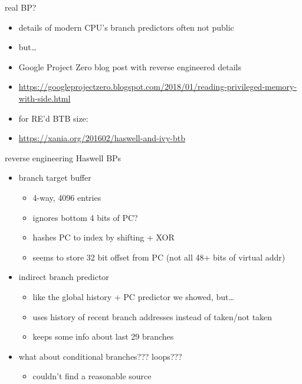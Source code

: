 \begin{frame}{real BP?}
\begin{itemize}
\item details of modern CPU's branch predictors often not public
\item but\ldots
\vspace{.5cm}
\item Google Project Zero blog post with reverse engineered details
\item \scriptsize \url{https://googleprojectzero.blogspot.com/2018/01/reading-privileged-memory-with-side.html}
\item for RE'd BTB size:
\item \scriptsize \url{https://xania.org/201602/haswell-and-ivy-btb}
\end{itemize}
\end{frame}

\begin{frame}{reverse engineering Haswell BPs}
\begin{itemize}
\item branch target buffer
    \begin{itemize}
    \item 4-way, 4096 entries
    \item ignores bottom 4 bits of PC?
    \item hashes PC to index by shifting + XOR
    \item seems to store 32 bit offset from PC (not all 48+ bits of virtual addr)
    \end{itemize}
\item indirect branch predictor
    \begin{itemize}
    \item like the global history + PC predictor we showed, but\ldots
    \item uses history of recent branch addresses instead of taken/not taken
    \item keeps some info about last 29 branches
    \end{itemize}
\item what about conditional branches??? loops???
    \begin{itemize}
    \item couldn't find a reasonable source
    \end{itemize}
\end{itemize}
\end{frame}
